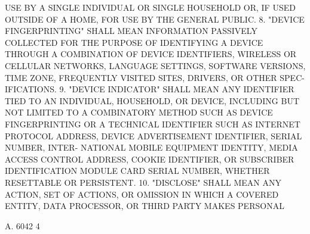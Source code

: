  USE  BY A SINGLE INDIVIDUAL OR SINGLE HOUSEHOLD OR, IF USED OUTSIDE OF A
 HOME, FOR USE BY THE GENERAL PUBLIC.
   8. "DEVICE FINGERPRINTING" SHALL MEAN INFORMATION PASSIVELY  COLLECTED
 FOR  THE PURPOSE OF IDENTIFYING A DEVICE THROUGH A COMBINATION OF DEVICE
 IDENTIFIERS, WIRELESS OR CELLULAR NETWORKS, LANGUAGE SETTINGS,  SOFTWARE
 VERSIONS,  TIME  ZONE, FREQUENTLY VISITED SITES, DRIVERS, OR OTHER SPEC-
 IFICATIONS.
   9. "DEVICE INDICATOR" SHALL MEAN ANY IDENTIFIER TIED TO AN INDIVIDUAL,
 HOUSEHOLD, OR DEVICE, INCLUDING BUT NOT LIMITED TO A COMBINATORY  METHOD
 SUCH AS DEVICE FINGERPRINTING OR A TECHNICAL IDENTIFIER SUCH AS INTERNET
 PROTOCOL ADDRESS, DEVICE ADVERTISEMENT IDENTIFIER, SERIAL NUMBER, INTER-
 NATIONAL MOBILE EQUIPMENT IDENTITY, MEDIA ACCESS CONTROL ADDRESS, COOKIE
 IDENTIFIER,  OR  SUBSCRIBER  IDENTIFICATION  MODULE  CARD SERIAL NUMBER,
 WHETHER RESETTABLE OR PERSISTENT.
   10. "DISCLOSE" SHALL MEAN ANY ACTION, SET OF ACTIONS, OR  OMISSION  IN
 WHICH  A  COVERED  ENTITY, DATA PROCESSOR, OR THIRD PARTY MAKES PERSONAL

 A. 6042                             4
 
